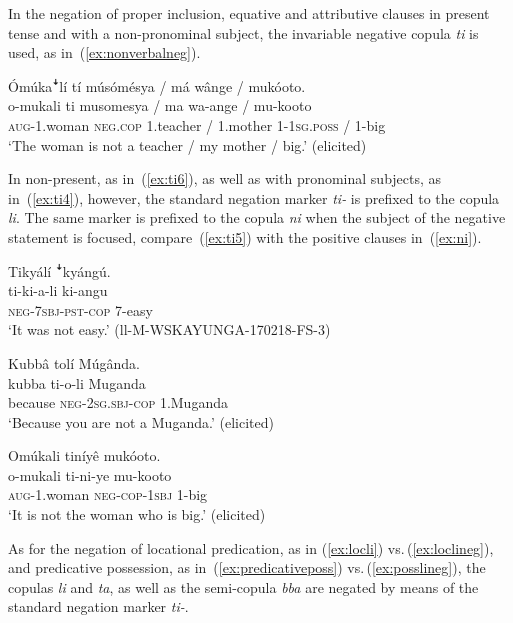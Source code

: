 \documentclass[output=paper,colorlinks,citecolor=brown,draftmode]{langscibook}
\begin{document}
In the negation of proper inclusion, equative and attributive clauses in present tense and with a non-pronominal subject, the invariable negative copula \textit{ti} is used, as in~(\ref{ex:nonverbalneg}). 

\ea \label{ex:nonverbalneg}\label{ex:ruulietal:18}
	\glll   Ómúkaꜜlí tí músómésya / má wânge / mukóoto.\\
	        o-mukali ti musomesya / ma wa-ange / mu-kooto\\
	    	\textsc{aug}-1.woman \textsc{neg.cop} 1.teacher / 1.mother 1-1\textsc{sg.poss}  / 1-big\\
	\glt ‘The woman is not a teacher / my mother / big.’  (elicited)
\z

\noindent In non-present, as in~(\ref{ex:ti6}), as well as with pronominal subjects, as in~(\ref{ex:ti4}), however, the standard negation marker \textit{ti-} is prefixed to the copula \textit{li}. 
The same marker is prefixed to the copula \textit{ni} when the subject of the negative statement is focused, compare~(\ref{ex:ti5}) with the positive clauses in~(\ref{ex:ni}).

\ea \label{ex:nonverbalneg2}\label{ex:ruulietal:19}
\begin{xlist}
\ex \label{ex:ti6}
	\glll  Tikyálí ꜜkyángú.\\
	        ti-ki-a-li ki-angu\\
		    \textsc{neg}-\textsc{7sbj}-\textsc{pst}-\textsc{cop} 7-easy\\
\glt ‘It was not easy.’ (ll-M-WSKAYUNGA-170218-FS-3)

\ex \label{ex:ti4}
	\glll   Kubbâ tolí Múgânda.\\
	        kubba ti-o-li Muganda\\
		    because \textsc{neg}-\textsc{2sg.sbj}-\textsc{cop} 1.Muganda\\
\glt ‘Because you are not a Muganda.’  (elicited)

\ex \label{ex:ti5}
	\glll   Omúkali  tiníyê mukóoto.\\
	        o-mukali ti-ni-ye mu-kooto\\
	    	\textsc{aug}-1.woman \textsc{neg}-\textsc{cop}-1\textsc{sbj} 1-big\\
	\glt ‘It is not the woman who is big.’ 	 (elicited)
\end{xlist}
\z

As for the negation of locational predication, as in (\ref{ex:locli}) vs.\,(\ref{ex:loclineg}), and predicative possession, as in~(\ref{ex:predicativeposs}) vs.\,(\ref{ex:posslineg}), the copulas \textit{li} and \textit{ta}, as well as the semi-copula \textit{bba} are negated by means of the standard negation marker \textit{ti-}. 
\end{document}
